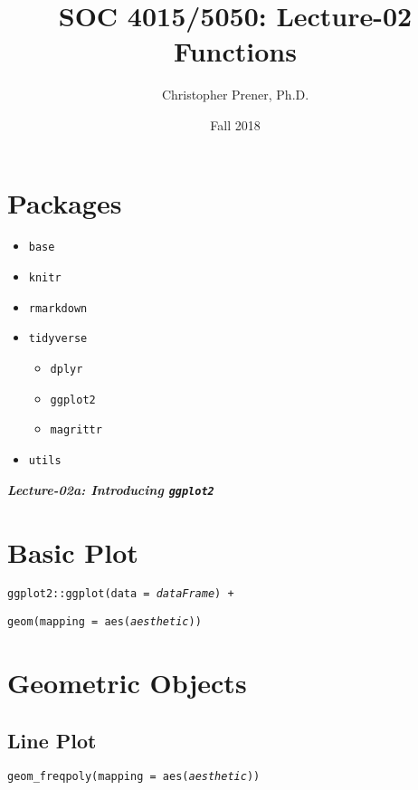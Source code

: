 \documentclass{tufte-handout}
\title{SOC 4015/5050: Lecture-02 Functions}
\author{Christopher Prener, Ph.D.}
\date{Fall 2018}
\begin{document}
\maketitle %

\vspace{5mm}
\section{Packages}
\begin{itemize}
\item \texttt{base}
\item \texttt{knitr}
\item \texttt{rmarkdown}
\item \texttt{tidyverse}
\begin{itemize}
\item \texttt{dplyr}
\item \texttt{ggplot2}
\item \texttt{magrittr}
\end{itemize}
\item \texttt{utils}
\end{itemize}


\vspace{5mm}
\begin{center}
{\Large\textit{\textbf{Lecture-02a: Introducing \texttt{ggplot2}}}}
\end{center}

\section{Basic Plot}
\texttt{ggplot2::}{\color{red}\texttt{ggplot}}\texttt{(data = \textit{dataFrame}) +}
\par \noindent \hspace{5mm} {\color{red}\texttt{geom}}\texttt{(mapping = aes(\textit{aesthetic}))}

\vspace{5mm}
\section{Geometric Objects}
\subsection{Line Plot}
{\color{red}\texttt{geom\_freqpoly}}\texttt{(mapping = aes(\textit{aesthetic}))}
\end{document}
